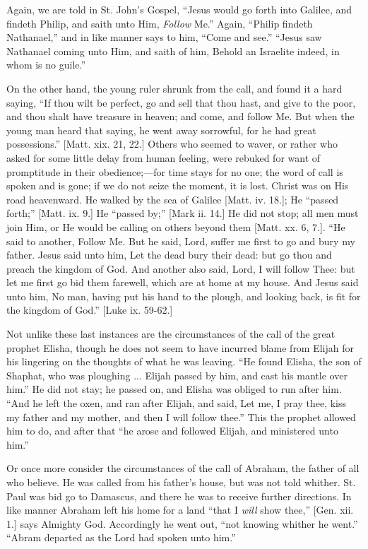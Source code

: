 Again, we are told in St. John's Gospel, ``Jesus would go forth
into Galilee, and findeth Philip, and saith unto Him, \emph{Follow}
Me.'' Again, ``Philip findeth Nathanael,'' and in like
manner says to him, ``Come and see.'' ``Jesus saw
Nathanael coming unto Him, and saith of him, Behold an Israelite
indeed, in whom is no guile.''

On the other hand, the young ruler shrunk from the call, and found
it a hard saying, ``If thou wilt be perfect, go and sell that thou
hast, and give to the poor, and thou shalt have treasure in heaven;
and come, and follow Me. But when the young man heard that saying, he
went away sorrowful, for he had great possessions.'' [Matt. xix.
21, 22.] Others who seemed to waver, or rather who asked for some
little delay from human feeling, were rebuked for want of promptitude
in their obedience;—for time stays for no one; the word of call is
spoken and is gone; if we do not seize the moment, it is lost. Christ
was on His road heavenward. He walked by the sea of Galilee [Matt. iv.
18.]; He ``passed forth;'' [Matt. ix. 9.] He ``passed
by;'' [Mark ii. 14.] He did not stop; all men must join Him, or He
would be calling on others beyond them [Matt. xx. 6, 7.]. ``He
said to another, Follow Me. But he said, Lord, suffer me first to go
and bury my father. Jesus said unto him, Let the dead bury their dead:
but go thou and preach the kingdom of God. And another also said,
Lord, I will follow Thee: but let me first go bid them farewell, which
are at home at my house. And Jesus said unto him, No man, having put
his hand to the plough, and looking back, is fit for the kingdom of
God.'' [Luke ix. 59-62.]

Not unlike these last instances are the circumstances of the call
of the great prophet Elisha, though he does not seem to have incurred
blame from Elijah for his lingering on the thoughts of what he was
leaving. ``He found Elisha, the son of Shaphat, who was ploughing
... Elijah passed by him, and cast his mantle over him.'' He did
not stay; he passed on, and Elisha was obliged to run after him.
``And he left the oxen, and ran after Elijah, and said, Let me, I
pray thee, kiss my father and my mother, and then I will follow
thee.'' This the prophet allowed him to do, and after that
``he arose and followed Elijah, and ministered unto him.''

Or once more consider the circumstances of the call of Abraham, the
father of all who believe. He was called from his father's house, but
was not told whither. St. Paul was bid go to Damascus, and there he
was to receive further directions. In like manner Abraham left his
home for a land ``that I \emph{will} show thee,'' [Gen. xii.
1.] says Almighty God. Accordingly he went out, ``not knowing
whither he went.'' ``Abram departed as the Lord had spoken
unto him.''

